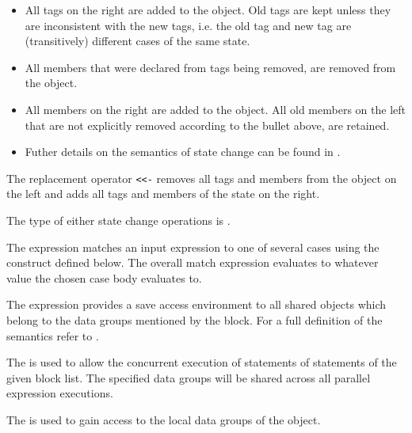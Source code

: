 \begin{itemize}

\item
All tags on the right are added to the object.  Old tags are kept
unless they are inconsistent with the new tags, i.e. the old tag and
new tag are (transitively) different cases of the same state.

\item
All members that were declared from tags being removed, are removed from
the object.

\item
All members on the right are added to the object.  All old members on
the left that are not explicitly removed according to the bullet
above, are retained.  

\item 
Futher details on the semantics of state change can be found in \citet{sunshine2011}.

\end{itemize}

The replacement operator \texttt{<{}<-} removes all tags and members from the object on the left and adds all tags and members of the state on the right.   

The type of either state change operations is .

The  expression matches an input expression to one of
several cases using the  construct defined below.
The overall match expression evaluates to whatever value the
chosen case body evaluates to.

The  expression provides a save access environment to all
shared objects which belong to the data groups mentioned by the
 block. For a full definition of the semantics refer to
\citet{stork09:concurrency_by_default, stork10:uaeminium_spec}.

The  is used to allow the concurrent execution of
statements of statements of the given block list. The specified data
groups will be shared across all parallel expression executions.

The  is used to gain access to the local data
groups of the object.

\begin{quote}


 {}  

 {} 


 {}





 {} 

\end{quote}

